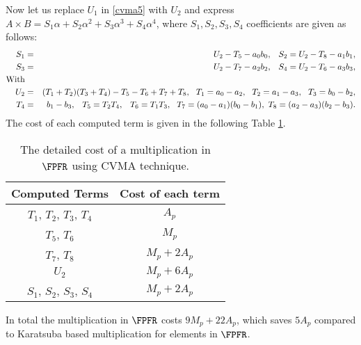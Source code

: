 Now let us replace $U_1$ in \eqref{cvma5} with $U_2$ and express $A\times B=S_1\alpha+S_2\alpha^2+S_3\alpha^3+S_4\alpha^4$, where $S_1,S_2,S_3,S_4$ coefficients are given as follows:
\begin{eqnarray*}
{S_1}&=&U_2-T_5-a_0b_0,\ \ \hspace{0.5mm}S_2=U_2-T_8-a_1b_1, \\ 
S_3&=&U_2-T_7-a_2b_2, \ \ \hspace{0.5mm} S_4=U_2-T_6-a_3b_3,\\
\text{With}\\
U_2&=&(T_1+T_2)(T_3+T_4)-T_5-T_6+T_7+T_8,\ \
T_1=a_0-a_2,\ \ T_2=a_1-a_3,\ \ T_3=b_0-b_2,\\
T_4&=&b_1-b_3,\ \  \hspace{0.5mm}T_5=T_2T_4,\ \ \hspace{0.5mm}T_6=T_1T_3,\ \
T_7=(a_0-a_1)(b_0-b_1),\
T_8=(a_2-a_3)(b_2-b_3).
\end{eqnarray*}
The cost of each computed term is given in the following Table \ref{tab_cmva_mul_cost}.
\renewcommand{\baselinestretch}{1.2}
\begin{table*}[!h]
	\centering
	\begin{tabular}{|c|c|}
		\hline
		 Computed  Terms & Cost of each term      \\ 
		 \hline
		$T_1$, $T_2$, $T_3$, $T_4$   & $ A_p$    \\ \hline
		$T_5$, $T_6$            &  $ M_p$     \\ \hline
		$T_7$, $T_8$          & $M_p+2A_p$   \\ \hline
		$U_2$ & $M_p+6A_p$ \\ \hline
		$S_1$, $S_2$, $S_3$, $S_4$ & $ M_p+2A_p$\\ \hline
	\end{tabular}
	\caption{The detailed cost of a multiplication in $\FPFR$ using CVMA technique.}
	\label{tab_cmva_mul_cost}
\end{table*}
\renewcommand{\baselinestretch}{1.0}
In total the multiplication in $\FPFR$ costs $9M_p+22A_p$, which saves $5A_p$ compared to Karatsuba based multiplication for elements in $\FPFR$.

